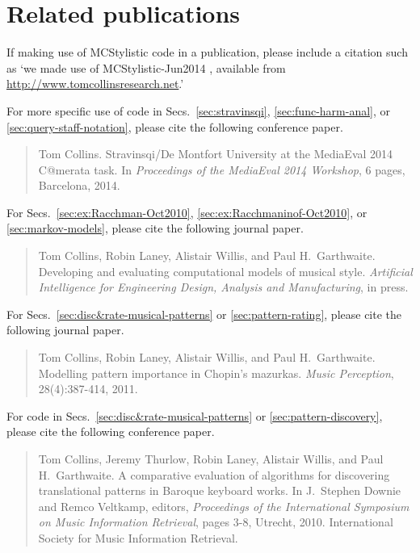 \chapter*{Related publications}

If making use of MCStylistic code in a publication, please include a citation such as `we made use of MCStylistic-Jun2014 \citep*{collins2011b}, available from \href{http://www.tomcollinsresearch.net}{http://www.tomcollinsresearch.net}.'

For more specific use of code in Secs.~\ref{sec:stravinsqi}, \ref{sec:func-harm-anal}, or \ref{sec:query-staff-notation}, please cite the following conference paper.

\begin{quotation}
\noindent Tom Collins. Stravinsqi/De Montfort University at the MediaEval 2014 C@merata task. In \emph{Proceedings of the MediaEval 2014 Workshop}, 6 pages, Barcelona, 2014.
\end{quotation}

\noindent For Secs.~\ref{sec:ex:Racchman-Oct2010}, \ref{sec:ex:Racchmaninof-Oct2010}, or \ref{sec:markov-models}, please cite the following journal paper.

\begin{quotation}
\noindent Tom Collins, Robin Laney, Alistair Willis, and Paul H.~Garthwaite. Developing and evaluating computational models of musical style. \emph{Artificial Intelligence for Engineering Design, Analysis and Manufacturing}, in press.
\end{quotation}

\noindent For Secs.~\ref{sec:disc&rate-musical-patterns} or \ref{sec:pattern-rating}, please cite the following journal paper.

\begin{quotation}
\noindent Tom Collins, Robin Laney, Alistair Willis, and Paul H.~Garthwaite. Modelling pattern importance in Chopin's mazurkas. \emph{Music Perception}, 28(4):387-414, 2011.
\end{quotation}

\noindent For code in Secs.~\ref{sec:disc&rate-musical-patterns} or \ref{sec:pattern-discovery}, please cite the following conference paper.

\begin{quotation}
\noindent Tom Collins, Jeremy Thurlow, Robin Laney, Alistair Willis, and Paul H.~Garthwaite. A comparative evaluation of algorithms for discovering translational patterns in Baroque keyboard works. In J.~Stephen Downie and Remco Veltkamp, editors, \emph{Proceedings of the International Symposium on Music Information Retrieval}, pages 3-8, Utrecht, 2010. International Society for Music Information Retrieval.
\end{quotation}

